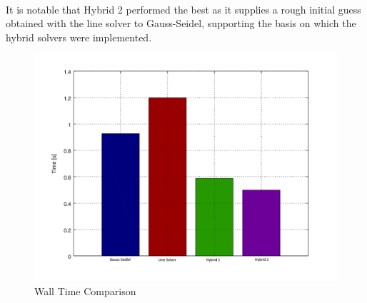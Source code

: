 \documentclass[12pt,twocolumn]{article}
\begin{document}
\paragraph{} It is notable that Hybrid 2 performed the best as it supplies a rough initial guess obtained with the line solver to Gauss-Seidel,
supporting the basis on which the hybrid solvers were implemented.
\begin{figure}
\label{fig:solution}
\includegraphics[width=\columnwidth]{plot/walltime.png}
\footnotesize{\caption{Wall Time Comparison}}
\end{figure}
\end{document}
